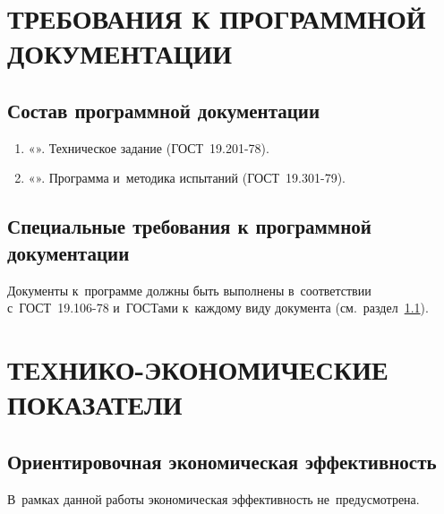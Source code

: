\documentclass[12pt,a4paper]{extarticle}
\begin{document}
\clearpage

\section{ТРЕБОВАНИЯ К ПРОГРАММНОЙ ДОКУМЕНТАЦИИ}

\subsection{Состав программной документации}
\label{sec:doc_composition}

\begin{enumerate}[label=\arabic*), leftmargin=1.25cm]
\item «\projectname». Техническое задание (ГОСТ~19.201-78).
\item «\projectname». Программа и~методика испытаний (ГОСТ~19.301-79).
\end{enumerate}

\subsection{Специальные требования к программной документации}
\label{sec:doc_reqs}

Документы к~программе должны быть выполнены в~соответствии с~ГОСТ~19.106-78 и~ГОСТами к~каждому виду документа (см.~раздел~\ref{sec:doc_composition}).

\clearpage

\section{ТЕХНИКО-ЭКОНОМИЧЕСКИЕ ПОКАЗАТЕЛИ}

\subsection{Ориентировочная экономическая эффективность}

В~рамках данной работы экономическая эффективность не~предусмотрена.
\end{document}
